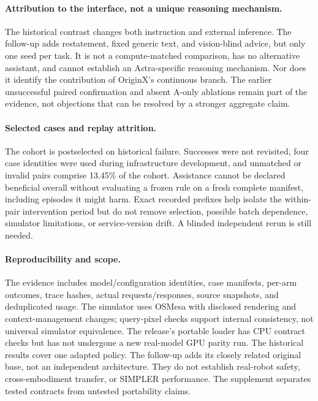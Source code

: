 \documentclass[10pt,twocolumn,letterpaper]{article}
\begin{document}
\paragraph{Attribution to the interface, not a unique reasoning mechanism.}
The historical contrast changes both instruction and external inference. The follow-up adds restatement, fixed generic text, and vision-blind advice, but only one seed per task. It is not a compute-matched comparison, has no alternative assistant, and cannot establish an Astra-specific reasoning mechanism. Nor does it identify the contribution of OriginX's continuous branch. The earlier unsuccessful paired confirmation and absent A-only ablations remain part of the evidence, not objections that can be resolved by a stronger aggregate claim.

\paragraph{Selected cases and replay attrition.}
The cohort is postselected on historical failure. Successes were not revisited, four case identities were used during infrastructure development, and unmatched or invalid pairs comprise 13.45\% of the cohort. Assistance cannot be declared beneficial overall without evaluating a frozen rule on a fresh complete manifest, including episodes it might harm. Exact recorded prefixes help isolate the within-pair intervention period but do not remove selection, possible batch dependence, simulator limitations, or service-version drift. A blinded independent rerun is still needed.

\paragraph{Reproducibility and scope.}
The evidence includes model/configuration identities, case manifests, per-arm outcomes, trace hashes, actual requests/responses, source snapshots, and deduplicated usage. The simulator uses OSMesa with disclosed rendering and context-management changes; query-pixel checks support internal consistency, not universal simulator equivalence. The release's portable loader has CPU contract checks but has not undergone a new real-model GPU parity run. The historical results cover one adapted policy. The follow-up adds its closely related original base, not an independent architecture. They do not establish real-robot safety, cross-embodiment transfer, or SIMPLER performance. The supplement separates tested contracts from untested portability claims.
\end{document}
